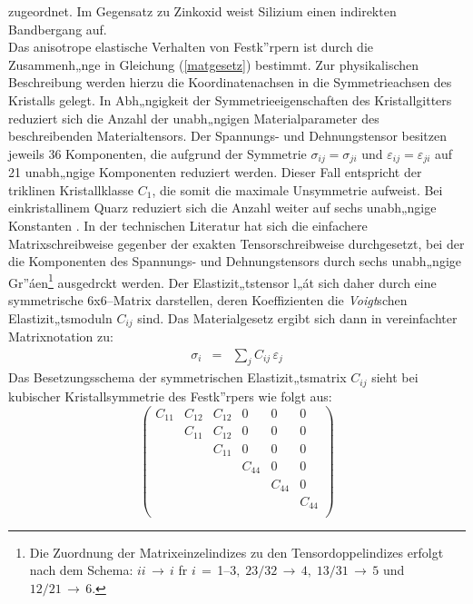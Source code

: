 zugeordnet. Im Gegensatz zu Zinkoxid weist Silizium einen indirekten
Bandbergang auf.\\
Das anisotrope elastische Verhalten von Festk”rpern ist durch die
Zusammenh„nge in Gleichung (\ref{matgesetz}) bestimmt.
Zur physikalischen Beschreibung werden hierzu
die Koordinatenachsen in die Symmetrieachsen des Kristalls gelegt.  In
Abh„ngigkeit der Symmetrieeigenschaften des Kristallgitters reduziert
sich die Anzahl der unabh„ngigen Materialparameter des beschreibenden
Materialtensors. Der Spannungs- und Dehnungstensor besitzen jeweils 36
Komponenten, die aufgrund der Symmetrie $ \sigma_{ij} =
\sigma_{ji}$ und $\varepsilon_{ij}  =  \varepsilon_{ji} $ auf
21 unabh„ngige Komponenten reduziert werden.  Dieser Fall entspricht der
triklinen Kristallklasse $ C_{1} $, die somit die maximale Unsymmetrie
aufweist. Bei einkristallinem Quarz reduziert sich die Anzahl weiter
auf sechs unabh„ngige Konstanten \cite{Bri85, Tic80}. In der technischen
Literatur hat sich die einfachere Matrixschreibweise gegenber der exakten
Tensorschreibweise durchgesetzt, bei der die Komponenten des Spannungs-
und Dehnungstensors durch sechs unabh„ngige Gr”áen\footnote{Die Zuordnung
der Matrixeinzelindizes zu den Tensordoppelindizes erfolgt nach dem Schema:
$ii \, \rightarrow \, i$ fr $i \, = \,$1--3$, \; 23/32 \, \rightarrow \, 4,
 \; 13/31 \, \rightarrow \, 5$ und $12/21 \, \rightarrow \, 6$.}
ausgedrckt werden.
Der Elastizit„tstensor l„át sich daher durch eine symmetrische
6x6--Matrix darstellen, deren
Koeffizienten die {\sl Voigt}schen Elastizit„tsmoduln $C_{ij}$ sind. Das
Materialgesetz ergibt sich dann in vereinfachter Matrixnotation zu:
%
\begin{eqnarray}
\label{voigt}
 \sigma_{i} & = & \sum_{j} C_{ij} \, \varepsilon_{j}
\end{eqnarray}
%
Das Besetzungsschema der symmetrischen Elastizit„tsmatrix $C_{ij}$ sieht
bei kubischer Kristallsymmetrie des Festk”rpers wie folgt aus:
\begin{displaymath}
 \left ( \begin{array}{llllll}
         C_{11}  &  C_{12}   &   C_{12}  &    0   &    0   &   0 \\
                 &  C_{11}   &   C_{12}  &    0   &    0   &   0 \\
                 &           &   C_{11}  &    0   &    0   &   0 \\
                 &           &           & C_{44} &    0   &   0 \\
                 &           &           &        & C_{44} &   0 \\
                 &           &           &        &        & C_{44}\\
 \end{array}
 \right )
\end{displaymath}

